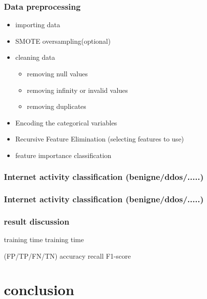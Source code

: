 \subsubsection{Data preprocessing}
\begin{itemize}
	\item importing data
	\item SMOTE oversampling(optional)
	\item cleaning data
		\begin{itemize}
			\item removing null values
			\item removing infinity or invalid values
			\item removing duplicates
		\end{itemize}
	\item Encoding the categorical variables
	\item Recursive Feature Elimination (selecting features to use)
	\item feature importance classification
\end{itemize}



\subsubsection{Internet activity classification (benigne/ddos/.....)}
\subsubsection{Internet activity classification (benigne/ddos/.....)}


\subsubsection{result discussion}

training time
training time

(FP/TP/FN/TN)
accuracy
recall
F1-score























\section{conclusion}

